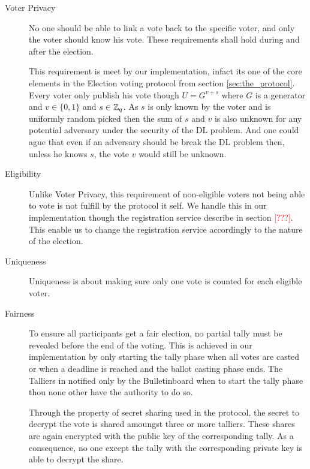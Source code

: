 \begin{description}
    \item[Voter Privacy]
        No one should be able to link a vote back to the specific voter, and only the voter should
        know his vote. These requirements shall hold during and after the election.  
        
        This requirement is meet by our implementation, infact its one of the core elements in the
        Election voting protocol from section \ref{sec:the_protocol}. Every voter only publish his vote
        though $U = G^{v+s}$ where $G$ is a generator and $v \in \{0,1\}$ and $s \in \mathbb{Z}_q$. As $s$ is only
        known by the voter and is uniformly random picked then the sum of $s$ and $v$ is also unknown for any 
        potential adversary under the security of the DL problem. And one could ague that even if an
        adversary should be break the DL problem then, unless he knows $s$, the vote $v$ would still
        be unknown. 
        
        
    \item[Eligibility]
        Unlike Voter Privacy, this requirement of non-eligible voters not being able to vote is not
        fulfill by the protocol it self. We handle this in our implementation though the registration service
        describe in section \textcolor{red}{[???]}. This enable us to change the registration service 
        accordingly to the nature of the election.         
        
        
    \item[Uniqueness]
        Uniqueness is about making sure only one vote is counted for each eligible
        voter. 
        
    \item[Fairness]
        To ensure all participants get a fair election, no partial tally must be
        revealed before the end of the voting. This is achieved in our implementation
        by only starting the tally phase when all votes are casted or when a deadline is 
        reached and the ballot casting phase ends. The Talliers in notified only by the Bulletinboard
        when to start the tally phase thou none other have the authority to do so.  
        
        Through the property of secret sharing used in the protocol, the secret to decrypt the
        vote is shared amoungst three or more talliers. These shares are again encrypted with the public key 
        of the corresponding tally. As a consequence, no one except the tally with the corresponding
        private key is able to decrypt the share.
        

\end{description}
